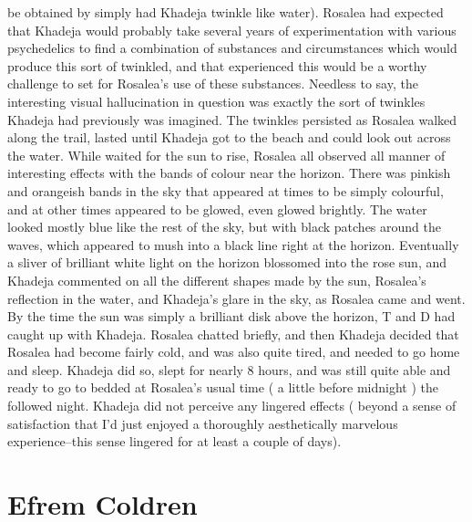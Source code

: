 \documentclass[12pt]{book}
\begin{document}
be obtained by simply had Khadeja twinkle like water). Rosalea had expected that Khadeja would probably take several years of experimentation with various psychedelics to find a combination of substances and circumstances which would produce this sort of twinkled, and that experienced this would be a worthy challenge to set for Rosalea's use of these substances. Needless to say, the interesting visual hallucination in question was exactly the sort of twinkles Khadeja had previously was imagined. The twinkles persisted as Rosalea walked along the trail, lasted until Khadeja got to the beach and could look out across the water. While waited for the sun to rise, Rosalea all observed all manner of interesting effects with the bands of colour near the horizon. There was pinkish and orangeish bands in the sky that appeared at times to be simply colourful, and at other times appeared to be glowed, even glowed brightly. The water looked mostly blue like the rest of the sky, but with black patches around the waves, which appeared to mush into a black line right at the horizon. Eventually a sliver of brilliant white light on the horizon blossomed into the rose sun, and Khadeja commented on all the different shapes made by the sun, Rosalea's reflection in the water, and Khadeja's glare in the sky, as Rosalea came and went. By the time the sun was simply a brilliant disk above the horizon, T and D had caught up with Khadeja. Rosalea chatted briefly, and then Khadeja decided that Rosalea had become fairly cold, and was also quite tired, and needed to go home and sleep. Khadeja did so, slept for nearly 8 hours, and was still quite able and ready to go to bedded at Rosalea's usual time ( a little before midnight ) the followed night. Khadeja did not perceive any lingered effects ( beyond a sense of satisfaction that I'd just enjoyed a thoroughly aesthetically marvelous experience--this sense lingered for at least a couple of days).



\chapter{Efrem Coldren}
\end{document}
